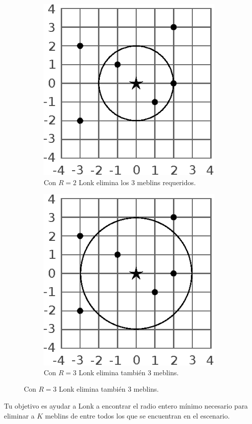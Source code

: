 \documentclass{oci}
\begin{document}
\begin{problemDescription}
  \begin{figure}[h]
    \centering
    \begin{subfigure}{0.3\textwidth}
      \centering
      \includegraphics[scale=0.8]{zolda2}
      \caption*{Con $R=2$ Lonk elimina los 3 meblins requeridos.}
    \end{subfigure}
    \hspace{3em}
    \begin{subfigure}{0.3\textwidth}
      \centering
      \includegraphics[scale=0.8]{zolda3}
      \caption*{Con $R=3$ Lonk elimina también 3 meblins.}
    \end{subfigure}
  \end{figure}

  Tu objetivo es ayudar a Lonk a encontrar el radio entero mínimo necesario para eliminar a $K$ meblins de entre todos los que se
  encuentran en el escenario.
\end{problemDescription}
\end{document}
